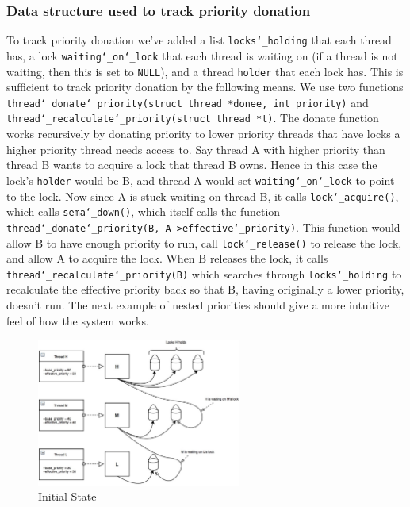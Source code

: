 \documentclass{article}
\renewcommand{\_}{\char`_}
\begin{document}
\subsubsection{Data structure used to track priority donation}
To track priority donation we've added a list \texttt{locks\_holding} that each thread has, a lock \texttt{waiting\_on\_lock} that each thread is waiting on (if a thread is not waiting, then this is set to \texttt{NULL}), and a thread \texttt{holder} that each lock has. This is sufficient to track priority donation by the following means. We use two functions \texttt{thread\_donate\_priority(struct thread *donee, int priority)} and \\ \texttt{thread\_recalculate\_priority(struct thread *t)}. The donate function works recursively by donating priority to lower priority threads that have locks a higher priority thread needs access to. Say thread A with higher priority than thread B wants to acquire a lock that thread B owns. Hence in this case the lock's \texttt{holder} would be B, and thread A would set \texttt{waiting\_on\_lock} to point to the lock. Now since A is stuck waiting on thread B, it calls \texttt{lock\_acquire()}, which calls \texttt{sema\_down()}, which itself calls the function \texttt{thread\_donate\_priority(B, A->effective\_priority)}. This function would allow B to have enough priority to run, call \texttt{lock\_release()} to release the lock, and allow A to acquire the lock. When B releases the lock, it calls  \texttt{thread\_recalculate\_priority(B)} which searches through \texttt{locks\_holding} to recalculate the effective priority back so that B, having originally a lower priority, doesn't run. The next example of nested priorities should give a more intuitive feel of how the system works.
\newpage

\begin{figure}[ht!]
\centering
\hspace{3em}
\includegraphics[width=0.6\textwidth]{Images/Task1/1Nested}
\caption{Initial State}
\end{figure}
\end{document}
